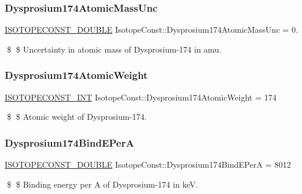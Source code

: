 \subsubsection{\texorpdfstring{Dysprosium174\+Atomic\+Mass\+Unc}{Dysprosium174AtomicMassUnc}}
{\footnotesize\ttfamily \mbox{\hyperlink{group___isotope_const-_macros_ga8f45a7272ce02c0b4c65c44636ed719a}{I\+S\+O\+T\+O\+P\+E\+C\+O\+N\+S\+T\+\_\+\+D\+O\+U\+B\+LE}} Isotope\+Const\+::\+Dysprosium174\+Atomic\+Mass\+Unc = 0.}

\$ \$ Uncertainty in atomic mass of Dysprosium-\/174 in amu. \mbox{\label{group___isotope_const-_dysprosium-_dy174_ga32b794cb421ecbf3dff96460c66edafc}} 
\subsubsection{\texorpdfstring{Dysprosium174\+Atomic\+Weight}{Dysprosium174AtomicWeight}}
{\footnotesize\ttfamily \mbox{\hyperlink{group___isotope_const-_macros_ga5f18360b3e99483a35c32d789e62621c}{I\+S\+O\+T\+O\+P\+E\+C\+O\+N\+S\+T\+\_\+\+I\+NT}} Isotope\+Const\+::\+Dysprosium174\+Atomic\+Weight = 174}

\$ \$ Atomic weight of Dysprosium-\/174. \mbox{\label{group___isotope_const-_dysprosium-_dy174_ga23a1f0bc32ce4c714b6886def56c39c2}} 
\subsubsection{\texorpdfstring{Dysprosium174\+Bind\+E\+PerA}{Dysprosium174BindEPerA}}
{\footnotesize\ttfamily \mbox{\hyperlink{group___isotope_const-_macros_ga8f45a7272ce02c0b4c65c44636ed719a}{I\+S\+O\+T\+O\+P\+E\+C\+O\+N\+S\+T\+\_\+\+D\+O\+U\+B\+LE}} Isotope\+Const\+::\+Dysprosium174\+Bind\+E\+PerA = 8012}

\$ \$ Binding energy per A of Dysprosium-\/174 in keV. \mbox{\label{group___isotope_const-_dysprosium-_dy174_ga437a1c4454ca5bb495819dc7f37ee754}} 
